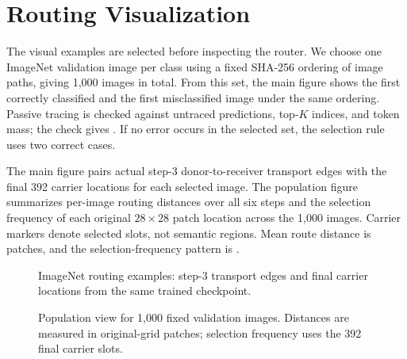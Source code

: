 \section{Routing Visualization}
\label{sec:pending-routing-population}

The visual examples are selected before inspecting the router.
We choose one ImageNet validation image per class using a fixed
SHA-256 ordering of image paths, giving 1,000 images in total. From
this set, the main figure shows the first correctly classified
and the first misclassified image under the same ordering. Passive
tracing is checked against untraced predictions, top-$K$ indices,
and token mass; the check gives .
If no error occurs in the selected set, the selection rule uses two
correct cases.

The main figure pairs actual step-3 donor-to-receiver transport
edges with the final 392 carrier locations for each selected image.
The population figure summarizes per-image routing distances
over all six steps and the selection frequency of each original
$28\times28$ patch location across the 1,000 images. Carrier
markers denote selected slots, not semantic regions. Mean route
distance is \pendingvalue{} patches, and the selection-frequency pattern
is .

\begin{figure}[htbp]
\centering
{}
\caption{ImageNet routing examples: step-3 transport edges and final
carrier locations from the same trained checkpoint.}
\label{fig:pending-routing}
\end{figure}

\begin{figure}[htbp]
\centering
{}
\caption{Population view for 1,000 fixed validation images.
Distances are measured in original-grid patches; selection frequency
uses the 392 final carrier slots.}
\label{fig:pending-routing-population}
\end{figure}
